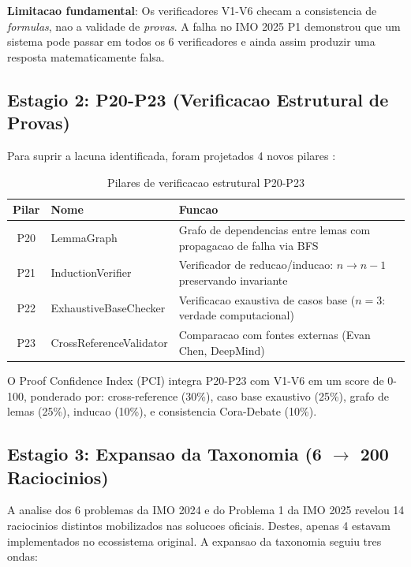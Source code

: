 \documentclass[5p]{elsarticle}
\begin{document}
\textbf{Limitacao fundamental}: Os verificadores V1-V6 checam a consistencia de
\textit{formulas}, nao a validade de \textit{provas}. A falha no IMO 2025 P1
demonstrou que um sistema pode passar em todos os 6 verificadores e ainda assim
produzir uma resposta matematicamente falsa.

\subsection{Estagio 2: P20-P23 (Verificacao Estrutural de Provas)}

Para suprir a lacuna identificada, foram projetados 4 novos pilares \cite{dossier2026}:

\begin{table}[H]
  \centering
  \caption{Pilares de verificacao estrutural P20-P23}
  \label{tab:p20p23}
  \begin{tabular}{clp{8cm}}
    \toprule
    \textbf{Pilar} & \textbf{Nome} & \textbf{Funcao} \\
    \midrule
    P20 & LemmaGraph & Grafo de dependencias entre lemas com propagacao de falha via BFS \\
    P21 & InductionVerifier & Verificador de reducao/inducao: $n\to n-1$ preservando invariante \\
    P22 & ExhaustiveBaseChecker & Verificacao exaustiva de casos base ($n=3$: verdade computacional) \\
    P23 & CrossReferenceValidator & Comparacao com fontes externas (Evan Chen, DeepMind) \\
    \bottomrule
  \end{tabular}
\end{table}

O Proof Confidence Index (PCI) integra P20-P23 com V1-V6 em um score de 0-100,
ponderado por: cross-reference (30\%), caso base exaustivo (25\%), grafo de lemas
(25\%), inducao (10\%), e consistencia Cora-Debate (10\%).

\subsection{Estagio 3: Expansao da Taxonomia (6 $\to$ 200 Raciocinios)}

A analise dos 6 problemas da IMO 2024 \cite{imo2024} e do Problema 1 da IMO 2025
revelou 14 raciocinios distintos mobilizados nas solucoes oficiais. Destes, apenas
4 estavam implementados no ecossistema original. A expansao da taxonomia \cite{taxonomia2026}
seguiu tres ondas:
\end{document}
